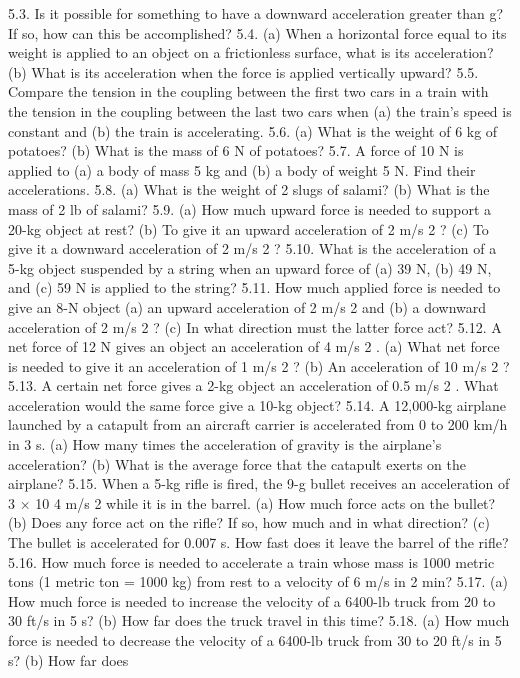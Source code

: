 5.3. Is it possible for something to have a downward acceleration greater than g? If so, how can this be accomplished?
5.4. (a) When a horizontal force equal to its weight is applied to an object on a frictionless surface, what is its acceleration?
(b) What is its acceleration when the force is applied vertically upward?
5.5. Compare the tension in the coupling between the first two cars in a train with the tension in the coupling between the
last two cars when (a) the train’s speed is constant and (b) the train is accelerating.
5.6. (a) What is the weight of 6 kg of potatoes? (b) What is the mass of 6 N of potatoes?
5.7. A force of 10 N is applied to (a) a body of mass 5 kg and (b) a body of weight 5 N. Find their accelerations.
5.8. (a) What is the weight of 2 slugs of salami? (b) What is the mass of 2 lb of salami?
5.9. (a) How much upward force is needed to support a 20-kg object at rest? (b) To give it an upward acceleration of
2 m/s 2 ? (c) To give it a downward acceleration of 2 m/s 2 ?
5.10. What is the acceleration of a 5-kg object suspended by a string when an upward force of (a) 39 N, (b) 49 N, and (c) 59
N is applied to the string?
5.11. How much applied force is needed to give an 8-N object (a) an upward acceleration of 2 m/s 2 and (b) a downward
acceleration of 2 m/s 2 ? (c) In what direction must the latter force act?
5.12. A net force of 12 N gives an object an acceleration of 4 m/s 2 . (a) What net force is needed to give it an acceleration
of 1 m/s 2 ? (b) An acceleration of 10 m/s 2 ?
5.13. A certain net force gives a 2-kg object an acceleration of 0.5 m/s 2 . What acceleration would the same force give a
10-kg object?
5.14. A 12,000-kg airplane launched by a catapult from an aircraft carrier is accelerated from 0 to 200 km/h in 3 s. (a) How
many times the acceleration of gravity is the airplane’s acceleration? (b) What is the average force that the catapult
exerts on the airplane?
5.15. When a 5-kg rifle is fired, the 9-g bullet receives an acceleration of 3 × 10 4 m/s 2 while it is in the barrel. (a) How
much force acts on the bullet? (b) Does any force act on the rifle? If so, how much and in what direction? (c) The
bullet is accelerated for 0.007 s. How fast does it leave the barrel of the rifle?
5.16. How much force is needed to accelerate a train whose mass is 1000 metric tons (1 metric ton = 1000 kg) from rest
to a velocity of 6 m/s in 2 min?
5.17. (a) How much force is needed to increase the velocity of a 6400-lb truck from 20 to 30 ft/s in 5 s? (b) How far does
the truck travel in this time?
5.18. (a) How much force is needed to decrease the velocity of a 6400-lb truck from 30 to 20 ft/s in 5 s? (b) How far does

